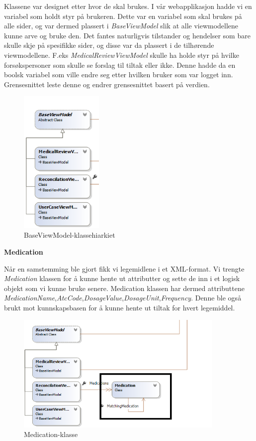 Klassene var designet etter hvor de skal brukes. I vår webapplikasjon hadde vi en variabel som holdt styr på brukeren. Dette var en variabel som skal brukes på alle sider, og var dermed plassert i \textit{BaseViewModel} slik at alle viewmodellene kunne arve og bruke den. Det fantes naturligvis tilstander og hendelser som bare skulle skje på spesifikke sider, og disse var da plassert i de tilhørende viewmodellene. F.eks \textit{MedicalReviewViewModel} skulle ha holde styr på hvilke forsøkspersoner som skulle se forslag til tiltak eller ikke. Denne hadde da en boolsk variabel som ville endre seg etter hvilken bruker som var logget inn. Grensesnittet leste denne og endrer grensesnittet basert på verdien.
\begin{figure}[H]
\centering
\includegraphics[width=4cm]{images/BaseViewModel.png}
\caption{BaseViewModel-klassehiarkiet}
\label{fig:baseviewmodel}
\end{figure}


\newpage
\textbf{Medication}

Når en samstemming ble gjort fikk vi legemidlene i et XML-format. Vi trengte \textit{Medication} klassen for å kunne hente ut attributter og sette de inn i et logisk objekt som vi kunne bruke senere. Medication klassen har dermed attributtene \textit{MedicationName},\textit{AtcCode},\textit{DosageValue},\textit{DosageUnit},\textit{Frequency}. Denne ble også brukt mot kunnskapsbasen for å kunne hente ut tiltak for hvert legemiddel.
\begin{figure}[H]
\centering
\includegraphics[width=10cm]{images/Medication.png}
\caption{Medication-klasse}
\label{fig:Medication}
\end{figure}


